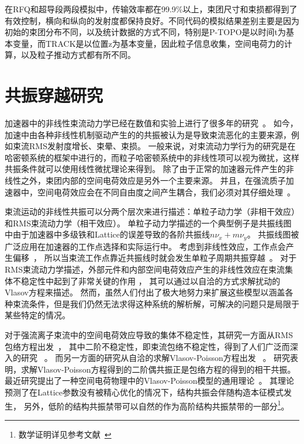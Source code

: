 在RFQ和超导段两段模拟中，传输效率都在99.9\%以上，束团尺寸和束损都得到了有效控制，横向和纵向的发射度都保持良好。不同代码的模拟结果差别主要是因为初始的束团分布不同，以及统计数据的方式不同，特别是P-TOPO是以时间t为基本变量，而TRACK是以位置z为基本变量，因此粒子信息收集，空间电荷力的计算，以及粒子推动方式都有所不同。

\section{共振穿越研究}            \label{section:Resonance_crossing}

加速器中的非线性束流动力学已经在数值和实验上进行了很多年的研究~\cite{accelerator2004lee,reiser2008theory}。
如今，加速中由各种非线性机制驱动产生的的共振被认为是导致束流恶化的主要来源，例如束流RMS发射度增长、束晕、束损。
一般来说，对束流动力学行为的研究是在哈密顿系统的框架中进行的，而粒子哈密顿系统中的非线性项可以视为微扰，这样共振条件就可以使用线性微扰理论来得到。
除了由于正常的加速器元件产生的非线性之外，束团内部的空间电荷效应是另外一个主要来源。
并且，在强流质子加速器中，空间电荷效应会在不同自由度之间产生耦合，我们必须对其仔细处理~\cite{accelerator2013chao}。

束流运动的非线性共振可以分两个层次来进行描述：单粒子动力学（非相干效应）和RMS束流动力学（相干效应）。
单粒子动力学描述的一个典型例子是共振线图中由于加速器中多级铁和Lattice的误差导致的各阶共振线$n\nu_x+m\nu_y$。
共振线图被广泛应用在加速器的工作点选择和实际运行中。
考虑到非线性效应，工作点会产生偏移~\cite{fedotov2001space}，
所以当束流工作点靠近共振线时就会发生单粒子周期共振穿越~\cite{franchetti2006particle}。
对于RMS束流动力学描述，外部元件和内部空间电荷效应产生的非线性效应在束流集体不稳定性中起到了非常关键的作用
\cite{sacherer1968transverse, sacherer1973longitudinal}，
其可以通过以自洽的方式求解扰动的Vlasov方程来描述\cite{chao1993physics,gluckstern1970oscillation,gluckstern1970stability}。
然而，虽然人们付出了极大地努力来扩展这些模型以涵盖各种束流条件，但是我们仍然无法求得这种系统的解析解，可解决的问题只是局限于某些特定的情况。

对于强流离子束流中的空间电荷效应导致的集体不稳定性，其研究一方面从RMS包络方程出发~\cite{sacherer1971rms}，
其中二阶不稳定性，即束流包络不稳定性，得到了人们广泛而深入的研究 ~\cite{14,15,16,17,21,22}。
而另一方面的研究从自洽的求解Vlasov-Poisson方程出发 ~\cite{11,12,18,19}。
研究表明，求解Vlasov-Poisson方程得到的二阶偶共振正是包络方程的得到的相干共振。
最近研究提出了一种空间电荷物理中的Vlasov-Poisson模型的通用理论~\cite{11, 12}。
其理论预测了在Lattice参数没有被精心优化的情况下，结构共振会伴随构造本征模式发生，
另外，低阶的结构共振禁带可以自然的作为高阶结构共振禁带的一部分\footnote{数学证明详见参考文献~\cite{12}}。

